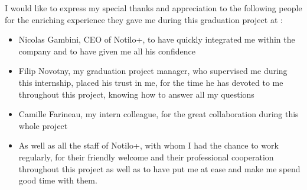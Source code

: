 \documentclass[
11pt, %
oneside, %
english, %
singlespacing, %
headsepline, %
]{MastersDoctoralThesis} %
\begin{document}

%
%




\begin{acknowledgements}
\addchaptertocentry{\acknowledgementname} %
I would like to express my special thanks and appreciation to the following people for the enriching
experience they gave me during this graduation project at \groupname:

\begin{itemize}
 \item Nicolas Gambini, CEO of Notilo+, to have quickly integrated me within the company and to have given me all his confidence
 \vspace*{3mm}
 \item Filip Novotny, my graduation project manager, who supervised me during this internship, placed his trust in me, for the time he has devoted to me throughout this project, knowing how to answer all my questions
 \vspace*{3mm}
 \item Camille Farineau, my intern colleague, for the great collaboration during this whole project
 \vspace*{3mm}
 \item As well as all the staff of Notilo+, with whom I had the chance to work regularly, for their friendly welcome and their professional cooperation throughout this project as well as to have put me at ease and make me spend good time with them.
\end{itemize}
\end{acknowledgements}
\end{document}
